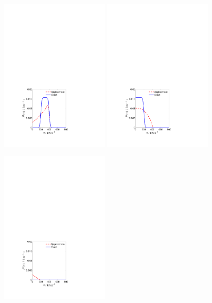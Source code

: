 \begin{figure}[ht!]

  \centering
  \includegraphics[trim={3.5cm 2cm 7.5cm 17cm},clip,width=0.49\textwidth]{Directional/STREAM_N3_1.pdf}
  \includegraphics[trim={3.5cm 2cm 7.5cm 17cm},clip,width=0.49\textwidth]{Directional/STREAM_N3_2.pdf}

  \includegraphics[trim={3.5cm 2cm 7.5cm 17cm},clip,width=0.49\textwidth]{Directional/STREAM_N3_3.pdf}


\end{figure}
